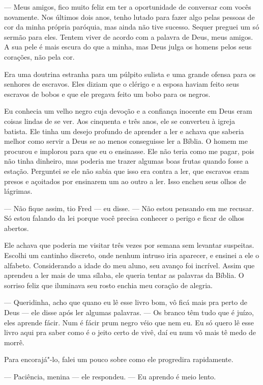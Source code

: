 --- Meus amigos, fico muito feliz em ter a oportunidade de conversar com
vocês novamente. Nos últimos dois anos, tenho lutado para fazer algo
pelas pessoas de cor da minha própria paróquia, mas ainda não tive
sucesso. Sequer preguei um só sermão para eles. Tentem viver de acordo
com a palavra de Deus, meus amigos. A sua pele é mais escura do que a
minha, mas Deus julga os homens pelos seus corações, não pela cor.

Era uma doutrina estranha para um púlpito sulista e uma grande ofensa
para os senhores de escravos. Eles diziam que o clérigo e a esposa
haviam feito seus escravos de bobos e que ele pregava feito um bobo para
os negros.

Eu conhecia um velho negro cuja devoção
e a confiança inocente em Deus eram coisas lindas de se ver. Aos
cinquenta e três anos, ele se converteu à igreja batista. Ele tinha um
desejo profundo de aprender a ler e achava que saberia melhor como
servir a Deus se ao menos conseguisse ler a Bíblia. O homem me procurou
e implorou para que eu o ensinasse. Ele não teria como me pagar, pois
não tinha dinheiro, mas poderia me trazer algumas boas frutas quando
fosse a estação. Perguntei se ele não sabia que isso era contra a ler,
que escravos eram presos e açoitados por ensinarem um ao outro a ler.
Isso encheu seus olhos de lágrimas.

--- Não fique assim, tio Fred --- eu disse. --- Não estou pensando em me
recusar. Só estou falando da lei porque você precisa conhecer o perigo e
ficar de olhos abertos.

Ele achava que poderia me visitar três vezes por semana sem levantar
suspeitas. Escolhi um cantinho discreto, onde nenhum intruso iria
aparecer, e ensinei a ele o alfabeto. Considerando a idade do meu aluno,
seu avanço foi incrível. Assim que aprendeu a ler mais de uma sílaba,
ele queria tentar as palavras da Bíblia. O sorriso feliz que iluminava
seu rosto enchia meu coração de alegria.

--- Queridinha, acho que quano eu lê esse livro bom, vô ficá mais pra
perto de Deus --- ele disse após ler algumas palavras. --- Os branco têm
tudo que é juízo, eles aprende fácir. Num é fácir prum negro véio que
nem eu. Eu só quero lê esse livro aqui pra saber como é o jeito certo de
vivê, daí eu num vô mais tê medo de morrê.

Para encorajá"-lo, falei um pouco sobre
como ele progredira rapidamente.

--- Paciência, menina --- ele respondeu. --- Eu aprendo é meio lento.

